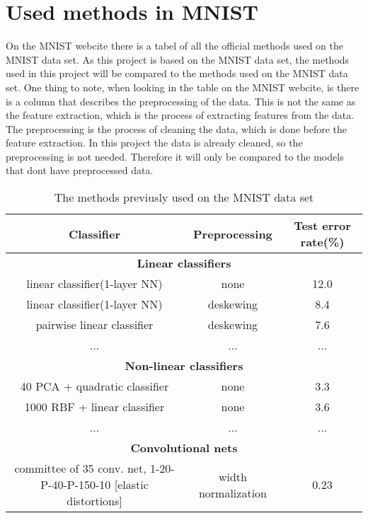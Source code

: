 \section{Used methods in MNIST}
On the MNIST webcite \cite{MNIST} there is a tabel of all the official methods used on the MNIST data set. As this project is based on the MNIST data set, the methods used in this project will be compared to the methods used on the MNIST data set. One thing to note, when looking in the table on the MNIST webcite, is there is a column that describes the preprocessing of the data. 
This is not the same as the feature extraction, which is the process of extracting features from the data. The preprocessing is the process of cleaning the data, which is done before the feature extraction. In this project the data is already cleaned, so the preprocessing is not needed. Therefore it will only be compared to the models that dont have preprocessed data. 

\begin{table}[h]
  \centering
  \resizebox{1\textwidth}{!}
  {
  \begin{tabular}{|c|c|c|}
      \hline
      Classifier & Preprocessing & Test error rate(\%)\\
      \hline
      \multicolumn{3}{|c|}{\textbf{Linear classifiers}} \\
      \hline
      linear classifier(1-layer NN) & none & 12.0 \\
      linear classifier(1-layer NN) & deskewing & 8.4 \\
      pairwise linear classifier & deskewing & 7.6 \\
      \hline
      ... & ... & ... \\ 
      \hline
      \multicolumn{3}{|c|}{\textbf{Non-linear classifiers}} \\
      \hline
      40 PCA + quadratic classifier & none & 3.3 \\
      1000 RBF + linear classifier & none & 3.6 \\
      \hline
      ... & ... & ... \\ 
      \hline
      \multicolumn{3}{|c|}{\textbf{Convolutional nets}} \\
      \hline
      committee of 35 conv. net, 1-20-P-40-P-150-10 [elastic distortions] & width normalization & 0.23 \\
      \hline
  \end{tabular}
  }
  \caption{The methods previusly used on the MNIST data set}
  \label{tab:method-MNIST}
\end{table}

